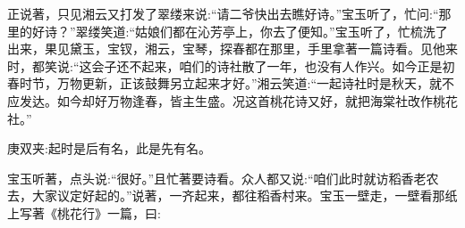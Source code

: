 \begin{parag}
    正说著，只见湘云又打发了翠缕来说:“请二爷快出去瞧好诗。”宝玉听了，忙问:“那里的好诗？”翠缕笑道:“姑娘们都在沁芳亭上，你去了便知。”宝玉听了，忙梳洗了出来，果见黛玉，宝钗，湘云，宝琴，探春都在那里，手里拿著一篇诗看。见他来时，都笑说:“这会子还不起来，咱们的诗社散了一年，也没有人作兴。如今正是初春时节，万物更新，正该鼓舞另立起来才好。”湘云笑道:“一起诗社时是秋天，就不应发达。如今却好万物逢春，皆主生盛。况这首桃花诗又好，就把海棠社改作桃花社。”\begin{note}庚双夹:起时是后有名，此是先有名。\end{note}宝玉听著，点头说:“很好。”且忙著要诗看。众人都又说:“咱们此时就访稻香老农去，大家议定好起的。”说著，一齐起来，都往稻香村来。宝玉一壁走，一壁看那纸上写著《桃花行》一篇，曰:
\end{parag}


